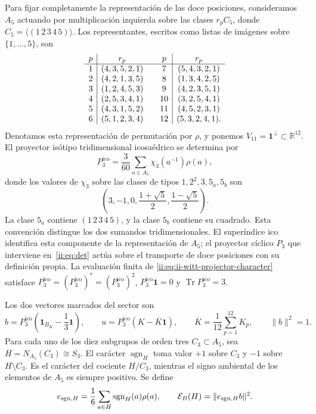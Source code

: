 Para fijar completamente la representación de las doce posiciones,
consideramos \(A_5\) actuando por multiplicación izquierda sobre las
clases \(r_pC_5\), donde \(C_5=\langle(1\,2\,3\,4\,5)\rangle\).
Los representantes, escritos como listas de imágenes sobre
\(\{1,\ldots,5\}\), son
\[
\begin{array}{c|c@{\qquad}c|c}
p&r_p&p&r_p\\ \hline
1&(4,3,5,2,1)&7&(5,4,3,2,1)\\
2&(4,2,1,3,5)&8&(1,3,4,2,5)\\
3&(1,2,4,5,3)&9&(4,2,3,5,1)\\
4&(2,5,3,4,1)&10&(3,2,5,4,1)\\
5&(4,3,1,5,2)&11&(4,5,2,3,1)\\
6&(5,1,2,3,4)&12&(5,3,2,4,1).
\end{array}
\]
Denotamos esta representación de permutación por \(\rho\), y ponemos
\(V_{11}=\mathbf1^\perp\subset\mathbb R^{12}\). El proyector
isótipo tridimensional icosaédrico se determina por
\begin{equation}
 P_3^{\mathrm{ico}}=\frac3{60}\sum_{a\in A_5}\chi_3(a^{-1})\rho(a),
 \label{ii:eq:ii-witt-projector-character}
\end{equation}
donde los valores de \(\chi_3\) sobre las clases de tipos
\(1,2^2,3,5_a,5_b\) son
\[
 \left(3,-1,0,\frac{1+\sqrt5}{2},\frac{1-\sqrt5}{2}\right).
\]
La clase \(5_a\) contiene \((1\,2\,3\,4\,5)\), y la clase
\(5_b\) contiene su cuadrado. Esta convención distingue los dos
sumandos tridimensionales. El superíndice \(\mathrm{ico}\) identifica
esta componente de la representación de \(A_5\); el proyector cíclico
\(P_3\) que interviene en~\eqref{ii:eq:det} actúa sobre el transporte de doce
posiciones con su definición propia. La evaluación finita de
\eqref{ii:eq:ii-witt-projector-character} satisface
\(P_3^{\mathrm{ico}}=(P_3^{\mathrm{ico}})^*=(P_3^{\mathrm{ico}})^2\), \(P_3^{\mathrm{ico}}\mathbf1=0\) y
\(\operatorname{Tr}P_3^{\mathrm{ico}}=3\).

Los dos vectores marcados del sector son
\[
 b=P_3^{\mathrm{ico}}\left(\mathbf1_{B_K}-\frac13\mathbf1\right),
 \qquad u=P_3^{\mathrm{ico}}(K-\overline K\mathbf1),
 \qquad \overline K=\frac1{12}\sum_{p=1}^{12}K_p,
 \qquad \|b\|^2=1.
\]
Para cada uno de los diez subgrupos de orden tres \(C_3\subset A_5\),
sea \(H=N_{A_5}(C_3)\cong S_3\). El carácter
\(\operatorname{sgn}_H\) toma valor \(+1\) sobre \(C_3\) y
\(-1\) sobre \(H\setminus C_3\). Es el carácter del cociente
\(H/C_3\), mientras el signo ambiental de los elementos de \(A_5\)
es siempre positivo. Se define
\begin{equation}
 e_{{\rm sgn},H}=\frac16\sum_{a\in H}\operatorname{sgn}_H(a)\rho(a),
 \qquad \mathcal E_B(H)=\|e_{{\rm sgn},H}b\|^2.
 \label{ii:eq:ii-witt-energy}
\end{equation}


